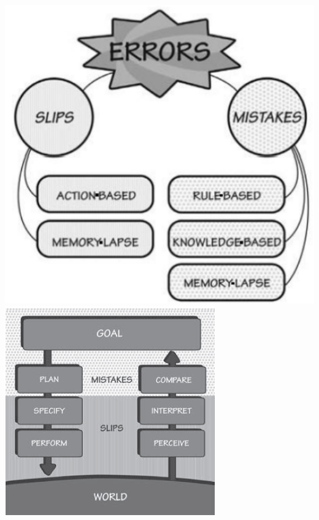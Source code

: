 \documentclass[a4paper,11pt,oneside]{book}
\begin{document}
\begin{multicols}{2}
	\centering
	\includegraphics[scale=0.25]{immagini/Errors.png}
	\includegraphics[scale=0.4]{immagini/Errors1.png}
\end{multicols}
\end{document}
